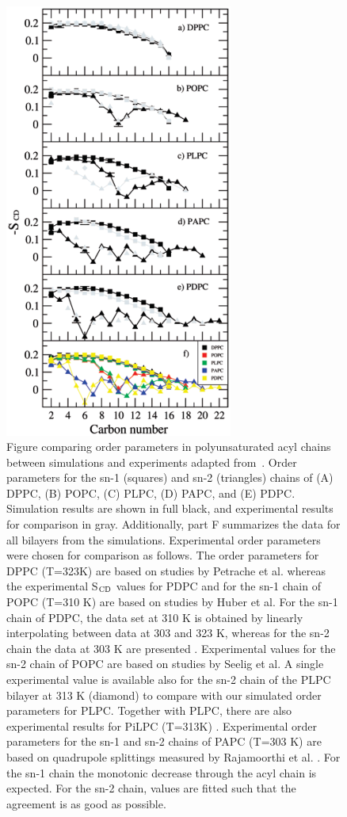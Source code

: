 \documentclass[aps,prl,superscriptaddress,twocolumn]{revtex4}
\begin{document}
\begin{figure}[]
  \includegraphics[width=7.5cm]{../Fig/polyunsat.eps}
\newline
  \caption{\label{polyunsat}
   Figure comparing order parameters in polyunsaturated acyl chains between simulations and 
   experiments adapted from~\cite{ollila07a}.
   Order parameters for the sn-1 (squares) and sn-2 (triangles)
   chains of (A) DPPC, (B) POPC, (C) PLPC, (D) PAPC, and (E) PDPC.
   Simulation results are shown in full black, and experimental results
   for comparison in gray. Additionally, part F summarizes the data for
   all bilayers from the simulations. Experimental order parameters were
   chosen for comparison as follows. The order parameters for DPPC (T=323K) 
   are based on studies by Petrache et al. \cite{petrache00} whereas the
   experimental S$_{{\rm CD}}$ values for PDPC and for the sn-1 chain of POPC (T=310 K) 
   are based on studies by Huber et al. \cite{huber02} For the sn-1 chain of
   PDPC, the data set at 310 K is obtained by linearly interpolating
   between data at 303 and 323 K, whereas for the sn-2 chain the data at
   303 K are presented \cite{huber02}. Experimental values for the sn-2 chain of POPC
   are based on studies by Seelig et al. \cite{seelig78} A single experimental value is
   available also for the sn-2 chain of the PLPC bilayer at 313 K
   (diamond) \cite{baenziger91} to compare with our simulated order parameters for PLPC.
   Together with PLPC, there are also experimental results for PiLPC (T=313K) \cite{baenziger91}. 
   Experimental order parameters for the sn-1 and sn-2 chains
   of PAPC (T=303 K) are based on quadrupole splittings measured by
   Rajamoorthi et al. \cite{rajamoorthi91}. For the sn-1 chain the monotonic decrease through
   the acyl chain is expected. For the sn-2 chain, values are fitted such
   that the agreement is as good as possible.
  } 
\end{figure}
\end{document}
